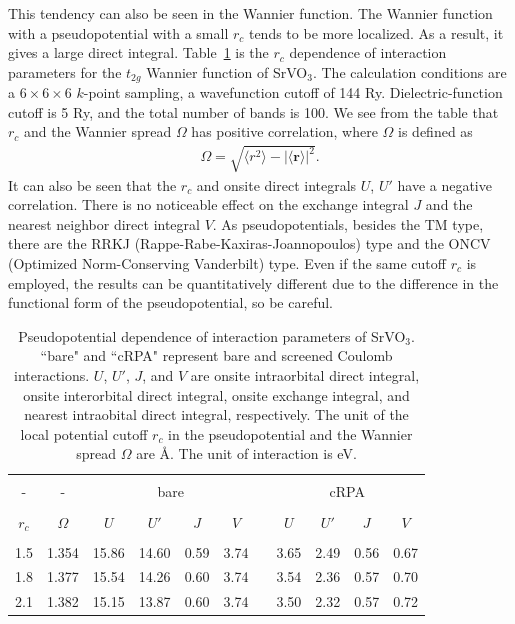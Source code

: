 \documentclass{article}
\begin{document}
This tendency can also be seen in the Wannier function. The Wannier function with a pseudopotential with a small $r_c$ tends to be more localized. As a result, it gives a large direct integral. Table~\ref{rc-vs-interaction} is the $r_c$ dependence of interaction parameters for the $t_{2g}$ Wannier function of SrVO$_3$. The calculation conditions are a $6\times6\times6$ $k$-point sampling, a wavefunction cutoff of 144 Ry. Dielectric-function cutoff is 5 Ry, and the total number of bands is 100. We see from the table that $r_c$ and the Wannier spread $\Omega$ has positive correlation, where $\Omega$ is defined as 
\begin{eqnarray}
\Omega=\sqrt{ \langle r^2 \rangle - |\langle \mathbf{r} \rangle|^2 }. \nonumber 
\end{eqnarray}
It can also be seen that the $r_c$ and onsite direct integrals $U$, $U'$ have a negative correlation. There is no noticeable effect on the exchange integral $J$ and the nearest neighbor direct integral $V$. As pseudopotentials, besides the TM type, there are the RRKJ (Rappe-Rabe-Kaxiras-Joannopoulos) type and the ONCV (Optimized Norm-Conserving Vanderbilt) type. Even if the same cutoff $r_c$ is employed, the results can be quantitatively different due to the difference in the functional form of the pseudopotential, so be careful.
\begin{table}[H] 
\begin{center}
\caption{Pseudopotential dependence of interaction parameters of SrVO$_3$. ``bare" and ``cRPA" represent bare and screened Coulomb interactions. $U$, $U'$, $J$, and $V$ are onsite intraorbital direct integral, onsite interorbital direct integral, onsite exchange integral, and nearest intraobital direct integral, respectively. The unit of the local potential cutoff $r_c$ in the pseudopotential and the Wannier spread $\Omega$ are \AA. The unit of interaction is eV.}  
\label{rc-vs-interaction}
\vspace{0.3cm} 
\begin{tabular}{c c@{\ \ \ } c@{\ } c@{\ } c@{\ } c@{\ } c@{\ \ } c@{\ }c@{\ }c@{\ }c@{\ }} \hline \hline  \\ [-10pt]  
  -          &      -    &  \multicolumn{4}{c}{bare}   &  &   \multicolumn{4}{c}{cRPA}   \\ \hline \\ [-10pt]  
 $r_c$  & $\Omega$ &  $U$ &   $U'$ &  $J$ &  $V$ &  &   $U$ &   $U'$ &  $J$ &  $V$ \\ \hline \\ [-10pt] 
 1.5    &   1.354  & 15.86 & 14.60  & 0.59 & 3.74 &  &  3.65 &  2.49  & 0.56 & 0.67 \\ 
 1.8    &   1.377  & 15.54 & 14.26  & 0.60 & 3.74 &  &  3.54 &  2.36  & 0.57 & 0.70 \\ 
 2.1    &   1.382  & 15.15 & 13.87  & 0.60 & 3.74 &  &  3.50 &  2.32  & 0.57 & 0.72 \\  \hline \hline
\end{tabular} 
\end{center}
\end{table} 
\end{document}
